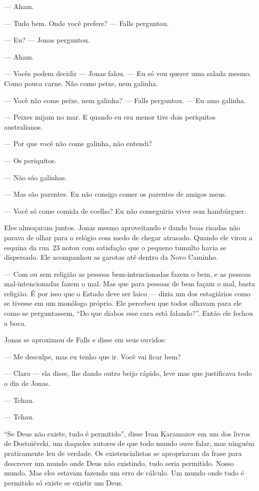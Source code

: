 --- Aham.

--- Tudo bem. Onde você prefere? --- Falls perguntou.

--- Eu? --- Jonas perguntou.

--- Aham.

--- Vocês podem decidir --- Jonas falou. --- Eu só vou querer uma salada mesmo. Como pouca carne. Não como peixe, nem galinha.

--- Você não come peixe, nem galinha? --- Falls perguntou. --- Eu amo galinha.

--- Peixes mijam no mar. E quando eu era menor\mudanca{,} tive dois periquitos australianos.

--- Por que você não come galinha, não entendi?

--- Os periquitos.

--- Não são galinhas.

--- Mas são parentes. Eu não consigo comer os parentes de amigos meus.

--- Você só come comida de coelho? Eu não conseguiria viver sem hambúrguer.

Eles almoçaram juntos. Jonas\mudanca{,} mesmo aproveitando e dando boas risadas\mudanca{,} não parava de olhar para o relógio\mudanca{,} com medo de chegar atrasado. Quando ele virou a esquina da rua~23 notou com satisfação que o pequeno tumulto havia se dispersado. Ele acompanhou as garotas até dentro da Novo Caminho.

--- Com ou sem religião as pessoas bem-intencionadas fazem o bem, e as pessoas mal-intencionadas fazem o mal. Mas que para pessoas de bem façam o mal, basta religião. É por isso que o Estado deve ser laico --- dizia um dos estagiários como se tivesse em um monólogo próprio. Ele percebeu que todos olhavam para ele como se perguntassem, ``Do que diabos esse cara está falando?''. Então ele fechou a boca.

Jonas se aproximou de Falls e disse em seus ouvidos:

--- Me desculpe, mas eu tenho que ir. Você vai ficar bem?

--- Claro --- ela disse, lhe dando outro beijo rápido, leve\mudanca{,} mas que justificava todo o dia de Jonas.

--- Tchau.

--- Tchau.

``Se Deus não existe, tudo é permitido'', disse Ivan Karamazov em um dos livros de Dostoiévski, um daqueles autores de que todo mundo ouve falar, mas ninguém praticamente leu de verdade. Os existencialistas se apropriaram da frase para descrever um mundo onde\mudanca{,} Deus não existindo, tudo seria permitido. Nosso mundo. Mas eles estavam fazendo um erro de cálculo. Um mundo onde tudo é permitido só existe se existir um Deus.

